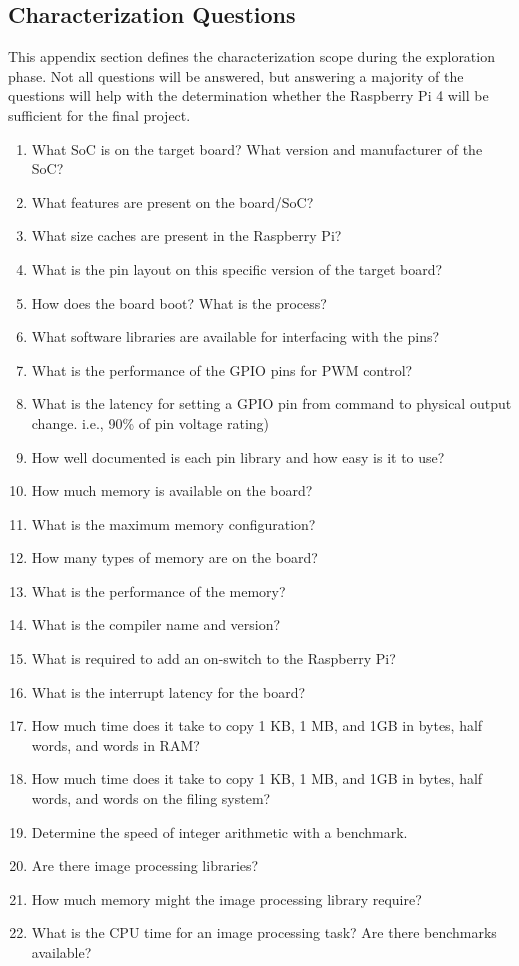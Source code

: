 \documentclass[journal]{IEEEtran}
\begin{document}
    \subsection{Characterization Questions}
    This appendix section defines the characterization scope during the exploration phase. Not all questions will be answered, but answering a majority of the questions will help with the determination whether
    the Raspberry Pi 4 will be sufficient for the final project.
    \begin{enumerate}
        \item What SoC is on the target board? What version and manufacturer of the SoC?
        \item What features are present on the board/SoC?
        \item What size caches are present in the Raspberry Pi?
        \item What is the pin layout on this specific version of the target board?
        \item How does the board boot? What is the process?
        \item What software libraries are available for interfacing with the pins?
        \item What is the performance of the GPIO pins for PWM control?
        \item What is the latency for setting a GPIO pin from command to physical output change. i.e., 90\% of pin voltage rating)
        \item How well documented is each pin library and how easy is it to use?
        \item How much memory is available on the board?
        \item What is the maximum memory configuration?
        \item How many types of memory are on the board?
        \item What is the performance of the memory?
        \item What is the compiler name and version?
        \item What is required to add an on-switch to the Raspberry Pi?
        \item What is the interrupt latency for the board?
        \item How much time does it take to copy 1 KB, 1 MB, and 1GB in bytes, half words, and words in RAM?
        \item How much time does it take to copy 1 KB, 1 MB, and 1GB in bytes, half words, and words on the
        ﬁling system?
        \item Determine the speed of integer arithmetic with a benchmark.
        \item Are there image processing libraries?
        \item How much memory might the image processing library require?
        \item What is the CPU time for an image processing task? Are there benchmarks available?
        

\end{enumerate}
\end{document}
